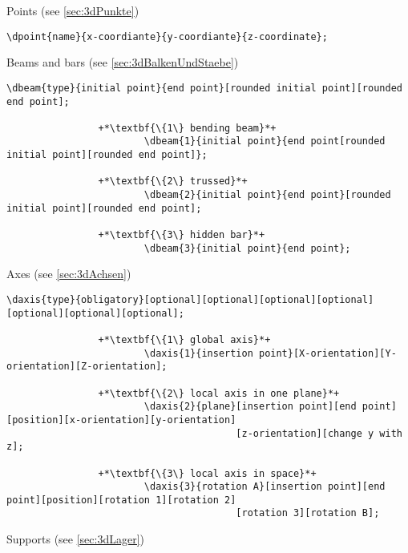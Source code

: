 \documentclass[%
  a4paper,
  BCOR20mm,
  pointlessnumbers,
  twoside,
  halfparskip,
  openright,
]{scrreprt}
\begin{document}
Points (see \ref{sec:3dPunkte})

\begin{lstlisting}[emph={dpoint},backgroundcolor=\color{white}]
		\dpoint{name}{x-coordiante}{y-coordiante}{z-coordinate};
\end{lstlisting}\vspace{-10mm}

Beams and bars (see \ref{sec:3dBalkenUndStaebe})

\begin{lstlisting}[emph={dbeam},backgroundcolor=\color{white}]
		\dbeam{type}{initial point}{end point}[rounded initial point][rounded end point];
		
				+*\textbf{\{1\} bending beam}*+
						\dbeam{1}{initial point}{end point[rounded initial point][rounded end point]};
						
				+*\textbf{\{2\} trussed}*+
						\dbeam{2}{initial point}{end point}[rounded initial point][rounded end point];
						
				+*\textbf{\{3\} hidden bar}*+
						\dbeam{3}{initial point}{end point};
\end{lstlisting}\vspace{-10mm}

Axes (see \ref{sec:3dAchsen})

\begin{lstlisting}[emph={daxis},backgroundcolor=\color{white}]
		\daxis{type}{obligatory}[optional][optional][optional][optional][optional][optional][optional];
		
				+*\textbf{\{1\} global axis}*+
						\daxis{1}{insertion point}[X-orientation][Y-orientation][Z-orientation];
						
				+*\textbf{\{2\} local axis in one plane}*+
						\daxis{2}{plane}[insertion point][end point][position][x-orientation][y-orientation]
										[z-orientation][change y with z];
						
				+*\textbf{\{3\} local axis in space}*+
						\daxis{3}{rotation A}[insertion point][end point][position][rotation 1][rotation 2]
										[rotation 3][rotation B];
\end{lstlisting}\vspace{-10mm}

Supports (see \ref{sec:3dLager})
\end{document}
